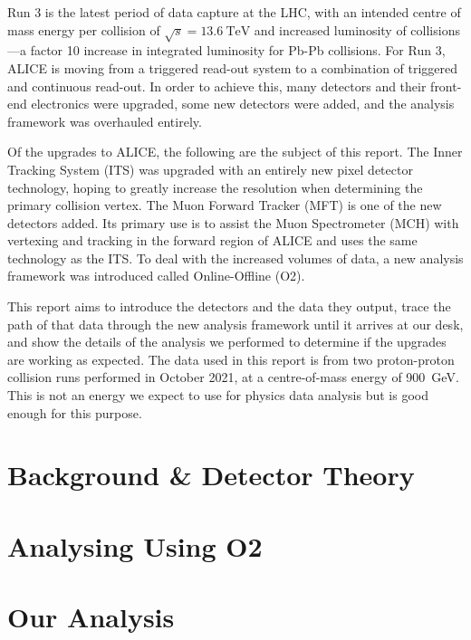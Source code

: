 \documentclass[11pt]{article}
\numberwithin{equation}{section}
\numberwithin{figure}{section}
\numberwithin{table}{section}
\begin{document}
Run 3 is the latest period of data capture at the LHC, with an intended centre of mass energy per collision of $\sqrt{s}=\SI{13.6}{\tera\electronvolt}$ and increased luminosity of collisions---a factor 10 increase in integrated luminosity for Pb-Pb collisions. For Run 3, ALICE is moving from a triggered read-out system to a combination of triggered and continuous read-out. In order to achieve this, many detectors and their front-end electronics were upgraded, some new detectors were added, and the analysis framework was overhauled entirely. 

Of the upgrades to ALICE, the following are the subject of this report. The Inner Tracking System (ITS) was upgraded with an entirely new pixel detector technology, hoping to greatly increase the resolution when determining the primary collision vertex. The Muon Forward Tracker (MFT) is one of the new detectors added. Its primary use is to assist the Muon Spectrometer (MCH) with vertexing and tracking in the forward region of ALICE and uses the same technology as the ITS. To deal with the increased volumes of data, a new analysis framework was introduced called Online-Offline (O2). 

This report aims to introduce the detectors and the data they output, trace the path of that data through the new analysis framework until it arrives at our desk, and show the details of the analysis we performed to determine if the upgrades are working as expected. The data used in this report is from two proton-proton collision runs performed in October 2021, at a centre-of-mass energy of \SI{900}{\giga\electronvolt}. This is not an energy we expect to use for physics data analysis but is good enough for this purpose.

\section{Background \& Detector Theory}\label{sec:Background_Detector}


\section{Analysing Using O2}\label{sec:AnalysingWithO2}


\section{Our Analysis}\label{sec:OurAnalysis}

\end{document}
